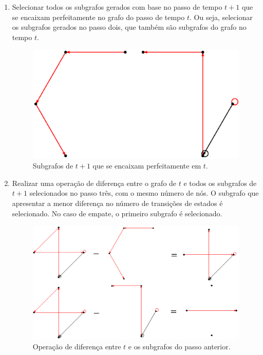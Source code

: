 \documentclass[12pt,a4paper]{article}
\begin{document}
\begin{enumerate}
\item Selecionar todos os subgrafos gerados com base no passo de tempo $t+1$
que se encaixam perfeitamente no grafo do passo de tempo $t$. Ou seja,
selecionar os subgrafos gerados no passo dois, que também são subgrafos do
grafo no tempo $t$.

\begin{figure}[H]
\begin{center}
\includegraphics[scale=0.6]{img/SelectSubGraph.eps}
\caption{Subgrafos de $t+1$ que se encaixam perfeitamente em $t$.}
\label{fig:selectsubgraph}
\end{center}
\end{figure}

\item Realizar uma operação de diferença entre o grafo de $t$ e todos os
subgrafos de $t+1$ selecionados no passo três, com o mesmo número de nós. O
subgrafo que apresentar a menor diferença no número de transições de estados
é selecionado. No caso de empate, o primeiro subgrafo é selecionado.

\begin{figure}[H]
\begin{center}
\includegraphics[scale=0.6]{img/DiffGraph.eps}
\caption{Operação de diferença entre $t$ e os subgrafos do passo anterior.}
\label{fig:diffgraph}
\end{center}
\end{figure}

\end{enumerate}
\end{document}
